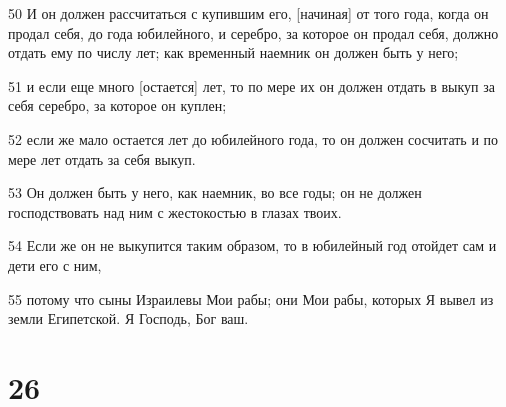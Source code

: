 \par 50 И он должен рассчитаться с купившим его, [начиная] от того года, когда он продал себя, до года юбилейного, и серебро, за которое он продал себя, должно отдать ему по числу лет; как временный наемник он должен быть у него;
\par 51 и если еще много [остается] лет, то по мере их он должен отдать в выкуп за себя серебро, за которое он куплен;
\par 52 если же мало остается лет до юбилейного года, то он должен сосчитать и по мере лет отдать за себя выкуп.
\par 53 Он должен быть у него, как наемник, во все годы; он не должен господствовать над ним с жестокостью в глазах твоих.
\par 54 Если же он не выкупится таким образом, то в юбилейный год отойдет сам и дети его с ним,
\par 55 потому что сыны Израилевы Мои рабы; они Мои рабы, которых Я вывел из земли Египетской. Я Господь, Бог ваш.

\chapter{26}

